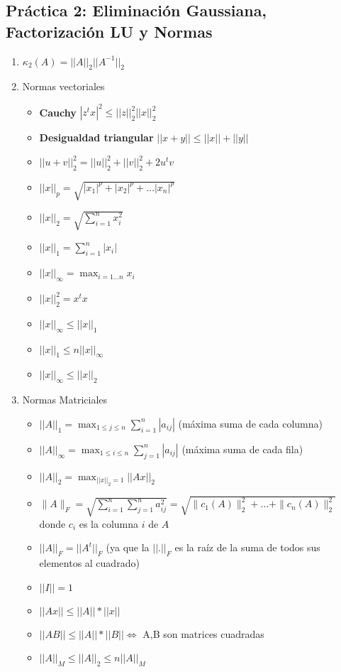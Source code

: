 \subsection*{Práctica 2: Eliminación Gaussiana, Factorización LU y Normas}
\begin{enumerate}
    \item $\kappa_2(A) = ||A||_2 ||A^{-1}||_2$
    
    \item Normas vectoriales
    \begin{itemize}
        \item \textbf{Cauchy} $|z^tx|^2 \leq ||z||_2^2 ||x||_2^2$
         \item \textbf{Desigualdad triangular} $||x+y|| \leq ||x||+||y||$
         \item $||u+v||_2^2 = ||u||_2^2+||v||_2^2 + 2u^tv$
         \item $||x||_p = \sqrt{|x_1|^p+|x_2|^p+\dots |x_n|^p}$
        \item $||x||_2 = \sqrt{\sum_{i=1}^{n} x_i^2}$
        \item $||x||_1 = \sum_{i=1}^{n} |x_i|$
        \item $||x||_{\infty}  = \max_{i=1 \dots n} x_i$
        \item $||x||_2^2 = x^tx$
        \item $||x||_{\infty} \leq ||x||_1$
        \item $||x||_1 \leq n ||x||_{\infty}$
        \item $||x||_{\infty} \leq ||x||_2$
    \end{itemize}
    
    \item Normas Matriciales
    \begin{itemize}
         \item $||A||_1 = \max_{1\leq j\leq n} \sum_{i=1}^{n} |a_{ij}|$ (máxima suma de cada columna)
          \item $||A||_{\infty} = \max_{1\leq i\leq n} \sum_{j=1}^{n} |a_{ij}|$ (máxima suma de cada fila)
         \item $||A||_2 = \max_{||x||_2=1} ||Ax||_2$
         \item $\| A \|_{F} = \sqrt{ \sum_{i=1}^{n}\sum_{j=1}^{n} a_{ij}^2 } = \sqrt{ \| c_1(A) \|_2^2 + \ldots + \| c_n(A) \|_2^2}$ donde $c_i$ es la columna $i$ de $A$ 
         \item $||A||_F = ||A^t||_F$ (ya que la $||.||_F$ es la raíz de la suma de todos sus elementos al cuadrado)
        \item $||I|| = 1$
        \item $||Ax|| \leq ||A||*||x||$
        \item $||AB|| \leq ||A||*||B|| \iff$ A,B son matrices cuadradas
        \item $||A||_M \leq ||A||_2 \leq n ||A||_M$
    \end{itemize}
    

\end{enumerate}
